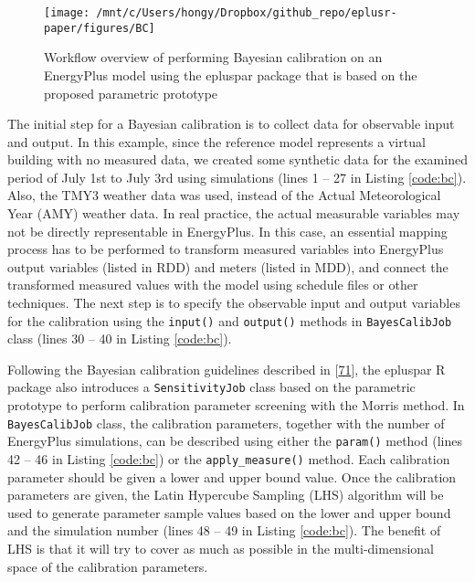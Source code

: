 \documentclass[3p, times]{elsarticle} %
\begin{document}
\begin{figure}[!htb]
\texttt{[image: /mnt/c/Users/hongy/Dropbox/github\_repo/eplusr-paper/figures/BC]} \caption{Workflow overview of performing Bayesian calibration on an EnergyPlus model using the epluspar package that is based on the proposed parametric prototype}\label{fig:flow-bc}
\end{figure}

The initial step for a Bayesian calibration is to collect data for observable
input and output. In this example, since the reference model represents a
virtual building with no measured data, we created some synthetic data for the
examined period of July 1st to July 3rd using simulations (lines 1 -- 27 in
Listing \ref{code:bc}). Also, the TMY3 weather data was used, instead of the
Actual Meteorological Year (AMY) weather data. In real practice, the actual
measurable variables may not be directly representable in EnergyPlus. In this
case, an essential mapping process has to be performed to transform measured
variables into EnergyPlus output variables (listed in RDD) and meters (listed in
MDD), and connect the transformed measured values with the model using schedule
files or other techniques. The next step is to specify the observable input and
output variables for the calibration using the \texttt{input()} and \texttt{output()} methods
in \texttt{BayesCalibJob} class (lines 30 -- 40 in Listing \ref{code:bc}).

Following the Bayesian calibration guidelines described in {[}\protect\hyperlink{ref-Chong2018}{71}{]}, the
epluspar R package also introduces a \texttt{SensitivityJob} class based on the
parametric prototype to perform calibration parameter screening with the Morris
method. In \texttt{BayesCalibJob} class, the calibration parameters, together with the
number of EnergyPlus simulations, can be described using either the \texttt{param()}
method (lines 42 -- 46 in Listing \ref{code:bc}) or the \texttt{apply\_measure()}
method. Each calibration parameter should be given a lower and upper bound
value. Once the calibration parameters are given, the Latin Hypercube Sampling
(LHS) algorithm will be used to generate parameter sample values based on the
lower and upper bound and the simulation number (lines 48 -- 49 in Listing
\ref{code:bc}). The benefit of LHS is that it will try to cover as much as
possible in the multi-dimensional space of the calibration parameters.
\end{document}
